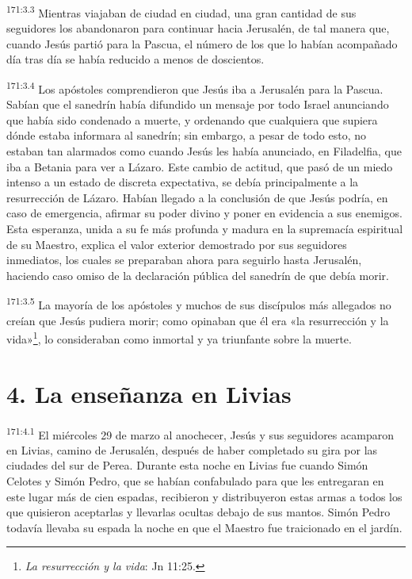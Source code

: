 \par
\textsuperscript{171:3.3} Mientras viajaban de ciudad en ciudad, una gran cantidad de sus seguidores los abandonaron para continuar hacia Jerusalén, de tal manera que, cuando Jesús partió para la Pascua, el número de los que lo habían acompañado día tras día se había reducido a menos de doscientos.

\par
\textsuperscript{171:3.4} Los apóstoles comprendieron que Jesús iba a Jerusalén para la Pascua. Sabían que el sanedrín había difundido un mensaje por todo Israel anunciando que había sido condenado a muerte, y ordenando que cualquiera que supiera dónde estaba informara al sanedrín; sin embargo, a pesar de todo esto, no estaban tan alarmados como cuando Jesús les había anunciado, en Filadelfia, que iba a Betania para ver a Lázaro. Este cambio de actitud, que pasó de un miedo intenso a un estado de discreta expectativa, se debía principalmente a la resurrección de Lázaro. Habían llegado a la conclusión de que Jesús podría, en caso de emergencia, afirmar su poder divino y poner en evidencia a sus enemigos. Esta esperanza, unida a su fe más profunda y madura en la supremacía espiritual de su Maestro, explica el valor exterior demostrado por sus seguidores inmediatos, los cuales se preparaban ahora para seguirlo hasta Jerusalén, haciendo caso omiso de la declaración pública del sanedrín de que debía morir.

\par
\textsuperscript{171:3.5} La mayoría de los apóstoles y muchos de sus discípulos más allegados no creían que Jesús pudiera morir; como opinaban que él era «la resurrección y la vida»\footnote{\textit{La resurrección y la vida}: Jn 11:25.}, lo consideraban como inmortal y ya triunfante sobre la muerte.

\section*{4. La enseñanza en Livias}
\par
\textsuperscript{171:4.1} El miércoles 29 de marzo al anochecer, Jesús y sus seguidores acamparon en Livias, camino de Jerusalén, después de haber completado su gira por las ciudades del sur de Perea. Durante esta noche en Livias fue cuando Simón Celotes y Simón Pedro, que se habían confabulado para que les entregaran en este lugar más de cien espadas, recibieron y distribuyeron estas armas a todos los que quisieron aceptarlas y llevarlas ocultas debajo de sus mantos. Simón Pedro todavía llevaba su espada la noche en que el Maestro fue traicionado en el jardín.

